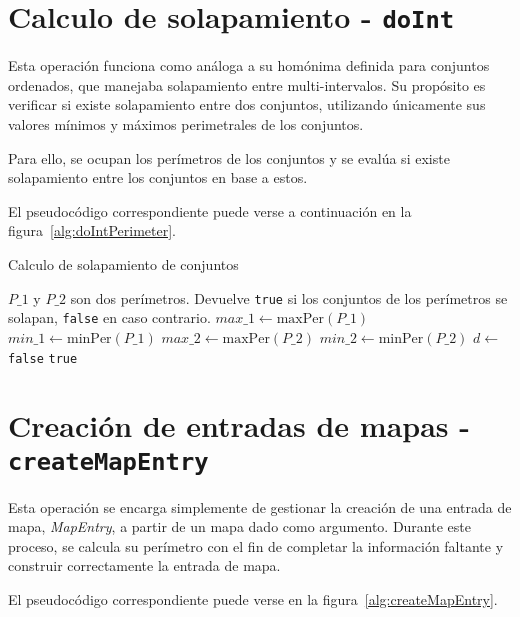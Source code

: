 \section*{Calculo de solapamiento - \texttt{doInt}}

Esta operación funciona como análoga a su homónima definida para conjuntos ordenados, que manejaba solapamiento entre multi-intervalos. Su propósito es verificar si existe solapamiento entre dos conjuntos, utilizando únicamente sus valores mínimos y máximos perimetrales de los conjuntos.

Para ello, se ocupan los perímetros de los conjuntos y se evalúa si existe solapamiento entre los conjuntos en base a estos.

El pseudocódigo correspondiente puede verse a continuación en la figura~\ref{alg:doIntPerimeter}.


\begin{algorithm}
\caption{Calculo de solapamiento de conjuntos}
\label{alg:doIntPerimeter}
\begin{algorithmic}[1]
\Require $P\_1$ y $P\_2$ son dos perímetros.
\Ensure Devuelve \texttt{true} si los conjuntos de los perímetros se solapan, \texttt{false} en caso contrario.
    \State $max\_1 \gets \mathrm{maxPer}(P\_1)$
    \State $min\_1 \gets \mathrm{minPer}(P\_1)$
    \State $max\_2 \gets \mathrm{maxPer}(P\_2)$
    \State $min\_2 \gets \mathrm{minPer}(P\_2)$
    \State $d \gets$ 
            \State \Return \texttt{false} 
        \EndIf
    \EndFor
    \State \Return \texttt{true}  
\EndFunction
\end{algorithmic}
\end{algorithm}


\section*{Creación de entradas de mapas - \texttt{createMapEntry}}

Esta operación se encarga simplemente de gestionar la creación de una entrada de mapa, \textit{MapEntry}, a partir de un mapa dado como argumento. Durante este proceso, se calcula su perímetro con el fin de completar la información faltante y construir correctamente la entrada de mapa.

El pseudocódigo correspondiente puede verse en la figura~\ref{alg:createMapEntry}.


